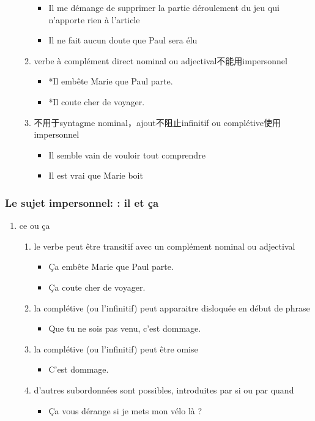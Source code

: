 \documentclass[UTF8]{report}
\begin{document}
\begin{enumerate}
\begin{enumerate}
\begin{itemize}
            \item Il me démange de supprimer la partie déroulement du jeu qui n’apporte rien à l’article
            \item Il ne fait aucun doute que Paul sera élu
        \end{itemize}
        \item verbe à complément direct nominal ou adjectival不能用impersonnel
        \begin{itemize}
            \item *Il embête Marie que Paul parte.
            \item *Il coute cher de voyager.
        \end{itemize}
        \item 不用于syntagme nominal，ajout不阻止infinitif ou complétive使用impersonnel
        \begin{itemize}
            \item Il semble vain de vouloir tout comprendre
            \item Il est vrai que Marie boit
        \end{itemize}
    \end{enumerate}
\end{enumerate}

\subsubsection{Le sujet impersonnel: : il et ça}
\begin{enumerate}
    \item ce ou ça
    \begin{enumerate}
        \item le verbe peut être transitif avec un complément nominal ou adjectival
        \begin{itemize}
            \item Ça embête Marie que Paul parte.
            \item Ça coute cher de voyager.
        \end{itemize}
        \item la complétive (ou l’infinitif) peut apparaitre disloquée en début de phrase
        \begin{itemize}
            \item Que tu ne sois pas venu, c’est dommage.
        \end{itemize}
        \item la complétive (ou l’infinitif) peut être omise
        \begin{itemize}
            \item C’est dommage.
        \end{itemize}
        \item d’autres subordonnées sont possibles, introduites par si ou par quand 
        \begin{itemize}
            \item Ça vous dérange si je mets mon vélo là ?
        \end{itemize}
    \end{enumerate}
\end{enumerate}
\end{document}
